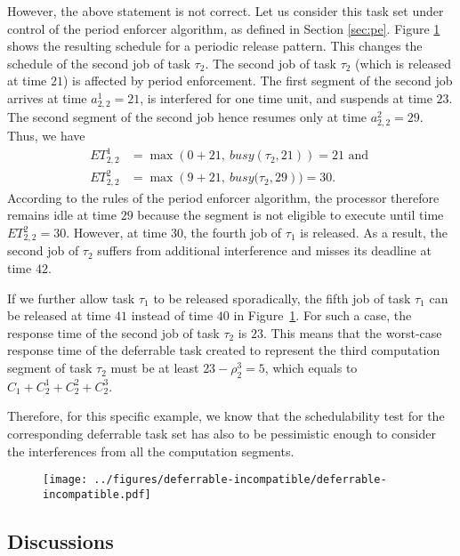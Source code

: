 However, the above statement is not correct. Let us consider this task set under control of the period enforcer algorithm, as defined in Section \ref{sec:pe}.
Figure \ref{fig:example-deferrable-incompatible} shows the resulting schedule for a periodic release pattern. This changes the schedule of the second job of task $\tau_2$. 
The second job of task $\tau_2$ (which is released at time $21$) is affected by period enforcement. The first segment of the second job arrives at time $a^1_{2,2} = 21$, is interfered for one time unit, and suspends at time $23$. The  second segment of the second job hence resumes only at time $a^2_{2,2} = 29$. Thus, we have
\begin{align*}
	ET_{2,2}^1 & = \max\left(0 + 21,\ \mathit{busy}(\tau_2, 21)\right) = 21  \text{ and }
\\
	ET_{2,2}^2 & = \max\left(9 + 21,\ \mathit{busy}(\tau_2, 29\right) ) = 30.
\end{align*}
According to the rules of the period enforcer algorithm, the processor therefore remains idle at time $29$ because the segment is not eligible to execute until time $ET_{2,2}^2 = 30$. However, at time $30$, the fourth job of $\tau_1$ is released. As a result, the second job of $\tau_2$ suffers from additional interference and misses its deadline at time $42$.

If we further allow task $\tau_1$ to be released sporadically, the fifth job of task $\tau_1$ can be released at time $41$ instead of time $40$ in Figure~\ref{fig:example-deferrable-incompatible}. For such a case, the response time of the second job of task $\tau_2$ is $23$. This means that the worst-case response time of the deferrable task created to represent the third computation segment of task $\tau_2$ must be at least $23-\rho_2^3=5$, which equals to $C_1 + C_2^1+C_2^2+C_2^3$.

Therefore, for this specific example, we know that the schedulability test for the  corresponding deferrable task set has also to be pessimistic enough to consider the interferences from all the computation segments.

\begin{figure}[t]
  \centering  
  \texttt{[image: ../figures/deferrable-incompatible/deferrable-incompatible.pdf]}
  \caption{}
  \label{fig:example-deferrable-incompatible}
\end{figure}

\subsection{Discussions}
\label{sec:discussions-deferrable}

